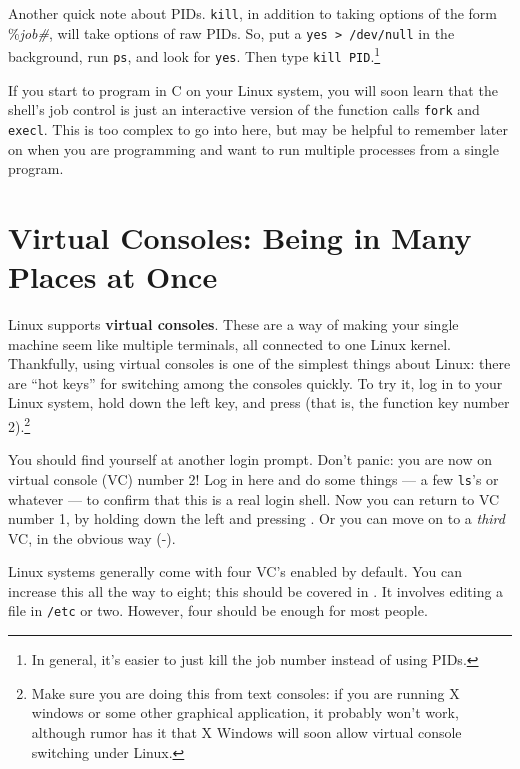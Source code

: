 Another quick note about PIDs.  {\tt kill}, in addition to taking
options of the form \%{\sl job\#}, will take options of raw PIDs. So,
put a {\tt yes > /dev/null} in the background, run {\tt ps}, and look
for {\tt yes}. Then type {\tt kill PID}.\footnote{In general, it's
  easier to just kill the job number instead of using PIDs.}

        If you start to program in C on your Linux system, you will
soon learn that the shell's job control is just an interactive version
of the function calls {\tt fork} and {\tt execl}.  This is too complex
to go into here, but may be helpful to remember later on when you are
programming and want to run multiple processes from a single program.

\section{Virtual Consoles: Being in Many Places at Once}

        Linux supports   {\bf virtual consoles}.  These are a way of making your single
machine seem like multiple terminals, all connected to one Linux kernel.
Thankfully, using virtual consoles is one of the simplest things about
Linux: there are ``hot keys'' for switching among the consoles quickly.  To
try it, log in to your Linux system, hold down the left
 key, and press  (that is, the function key number
2).\footnote{Make sure you are doing this from text consoles: if you
are running X windows or some other graphical application, it probably
won't work, although rumor has it that X Windows will soon allow
virtual console switching under Linux.}  

        You should find yourself at another login prompt.  Don't
panic: you are now on virtual console (VC) number 2!  Log in here and
do some things --- a few {\tt ls}'s or whatever --- to confirm that
this is a real login shell.  Now you can return to VC number 1, by
holding down the left  and pressing .  Or you can
move on to a {\em third} VC, in the obvious way (-).

        Linux systems generally come with four VC's enabled by
default.  You can increase this all the way to eight; this should be
covered in \ldpsa.  It involves
editing a file in {\tt /etc} or two.  However, four should be enough
for most people.

